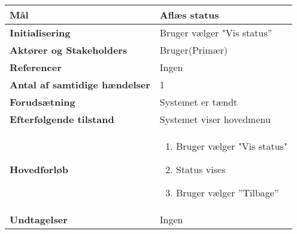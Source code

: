 \begin{table}[H] \centering
\begin{tabular}{|p{6cm}|p{8cm}|}
	\hline
		\textbf{Mål}	&
			Aflæs status \\\hline
		\textbf{Initialisering} &
			Bruger vælger "Vis status” \\\hline
		\textbf{Aktører og Stakeholders} &
			Bruger(Primær) \\\hline
		\textbf{Referencer} &
			Ingen \\\hline
		\textbf{Antal af samtidige hændelser} &
			1 \\\hline
		\textbf{Forudsætning} &
			Systemet er tændt \\\hline
		\textbf{Efterfølgende tilstand} &
			Systemet viser hovedmenu \\\hline
		\textbf{Hovedforløb} &
		
		\begin{enumerate}
			\item Bruger vælger "Vis status"
			\item Status vises
			\item Bruger vælger ''Tilbage''
		\end{enumerate} \\\hline
		
		\textbf{Undtagelser} &
			Ingen \\\hline
	\end{tabular}
	\label{UC3} 
\end{table}